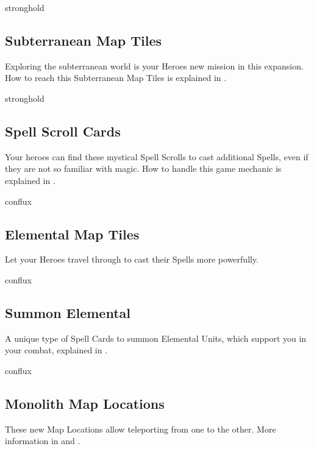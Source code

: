 \begin{multicols*}{2}
\vspace*{1em}
\begin{expansion}{stronghold}
	\subsection*{Subterranean Map Tiles}
	Exploring the subterranean world is your Heroes new mission in this expansion. How to reach this Subterranean Map Tiles is explained in .
\end{expansion}

\vspace*{1em}
\begin{expansion}{stronghold}
	\subsection*{Spell Scroll Cards}
	Your heroes can find these mystical Spell Scrolls to cast additional Spells, even if they are not so familiar with magic. How to handle this game mechanic is explained in .
\end{expansion}

\vspace*{1em}
\begin{expansion}{conflux}
	\subsection*{Elemental Map Tiles}
	Let your Heroes travel through  to cast their Spells more powerfully.
\end{expansion}

\vspace*{1em}
\begin{expansion}{conflux}
	\subsection*{Summon Elemental}
	A unique type of Spell Cards to summon Elemental Units, which support you in your combat, explained in .
\end{expansion}

\vspace*{1em}
\begin{expansion}{conflux}
	\subsection*{Monolith Map Locations}
	These new Map Locations allow teleporting from one to the other.
	More information in  and .
\end{expansion}


\end{multicols*}
